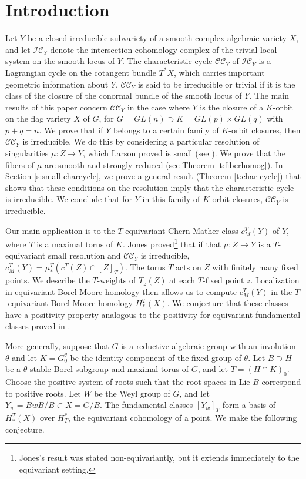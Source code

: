 \documentclass[11pt,letterpaper,reqno]{amsart}
\newcommand{\cC}{\mathcal C}
\newcommand{\cI}{\mathcal I}
\newcommand{\IC}{\cI \cC}
\newcommand{\CC}{\cC \cC}
\numberwithin{equation}{section}
\theoremstyle{plain}
\theoremstyle{definition}
\theoremstyle{remark}
\begin{document}
\section{Introduction}


Let $Y$ be a closed irreducible subvariety of a smooth complex algebraic variety $X$, and let \(\IC_Y\) denote the intersection cohomology complex of the trivial local system on the smooth locus of \(Y\).  The characteristic cycle \(\CC_Y\) of \(\IC_Y\) is a Lagrangian cycle on the cotangent bundle $T^*X$, which
carries important geometric information about $Y$.  $\CC_Y$ is said to be irreducible or trivial if it is the
class of the closure of the conormal bundle of the smooth locus of $Y$.  The main results of this paper concern $\CC_Y$
in the case where $Y$ is the closure of a $K$-orbit on the flag variety
$X$ of $G$, for $G = GL(n) \supset K = GL(p) \times GL(q)$ with $p+q=n$.  We prove that if $Y$ belongs to a certain family of $K$-orbit closures, then $\CC_Y$ is irreducible.
We do this by considering a particular resolution of singularities $\mu: Z \to Y$, which Larson proved is small (see \cite{Lar}).  We prove that the fibers
of $\mu$ are smooth and strongly reduced (see Theorem \ref{t:fiberhomog}).
In Section \ref{s:small-charcycle}, we prove a general result (Theorem \ref{t:char-cycle}) that shows that these conditions
on the resolution imply that the characteristic cycle is irreducible.  We conclude that for $Y$ in this family of $K$-orbit closures, $\CC_Y$ is irreducible.

Our main application is to the $T$-equivariant Chern-Mather class $c_M^T(Y)$ of $Y$, where
$T$ is a maximal torus of $K$.  Jones proved\footnote{Jones's result was stated
non-equivariantly, but it extends immediately to the equivariant setting.} that if
that $\mu: Z \to Y$ is a $T$-equivariant small resolution and $\CC_Y$ is irreducible, $c_M^T(Y) = \mu_*^T(c^T(Z) \cap [Z]_T)$.  
The torus $T$ acts on $Z$ with finitely many fixed points.  We describe the $T$-weights of $T_z(Z)$ at each $T$-fixed
point $z$.  Localization in equivariant Borel-Moore homology then allows us to compute $c_M^T(Y)$ in
the $T$-equivariant Borel-Moore homology $H^T_*(X)$.  We conjecture that these classes have a positivity
property analogous to the positivity for equivariant fundamental classes proved in \cite[Theorem 3.2]{Gra}.

More generally, suppose that $G$ is a reductive algebraic group with an involution $\theta$ and let $K = G^{\theta}_0$
be the identity component of the fixed group of $\theta$.  Let $B \supset H$ be a $\theta$-stable Borel subgroup
and maximal torus of $G$, and let $T = (H \cap K)_0$.  Choose the positive system of roots such that
the root spaces in $\mbox{Lie }B$ correspond to positive roots.  Let $W$ be the Weyl group of $G$, and
let $Y_w = \overline{B w B}/B \subset X = G/B$.  The fundamental classes $[Y_w]_T$ form a basis of $H^T_*(X)$ 
over $H^*_T$, the equivariant cohomology of a point.  We make the following conjecture.
\end{document}
